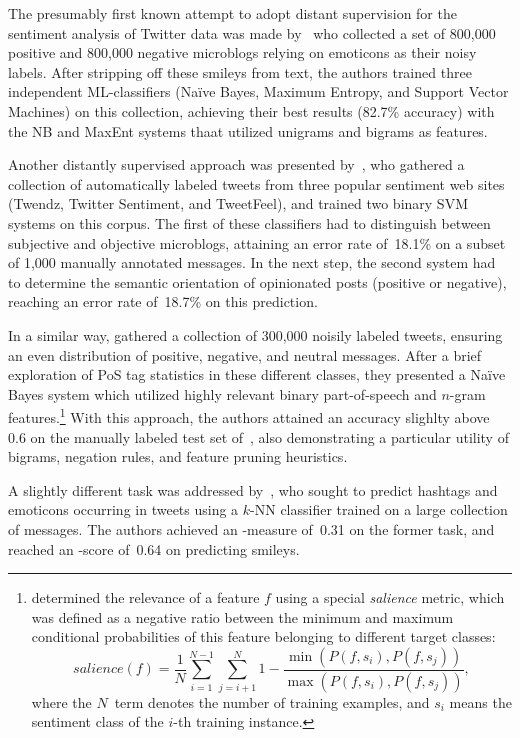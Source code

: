 The presumably first known attempt to adopt distant supervision for
the sentiment analysis of Twitter data was made by~\citet{Go:09} who
collected a set of 800,000 positive and 800,000 negative microblogs
relying on emoticons as their noisy labels.  After stripping off these
smileys from text, the authors trained three independent
ML-classifiers (Na{\"i}ve Bayes, Maximum Entropy, and Support Vector
Machines) on this collection, achieving their best results (82.7\%
accuracy) with the NB and MaxEnt systems thaat utilized unigrams and
bigrams as features.

Another distantly supervised approach was presented
by~\citet{Barbosa:10}, who gathered a collection of automatically
labeled tweets from three popular sentiment web sites (Twendz, Twitter
Sentiment, and TweetFeel), and trained two binary SVM systems on this
corpus.  The first of these classifiers had to distinguish between
subjective and objective microblogs, attaining an error rate of~18.1\%
on a subset of 1,000 manually annotated messages.  In the next step,
the second system had to determine the semantic orientation of
opinionated posts (positive or negative), reaching an error rate
of~18.7\% on this prediction.

In a similar way, \citet{Pak:10} gathered a collection of 300,000
noisily labeled tweets, ensuring an even distribution of positive,
negative, and neutral messages.  After a brief exploration of PoS tag
statistics in these different classes, they presented a Na{\"i}ve
Bayes system which utilized highly relevant binary part-of-speech and
$n$-gram features.\footnote{\citet{Pak:10} determined the relevance of
  a feature $f$ using a special \emph{salience} metric, which was
  defined as a negative ratio between the minimum and maximum
  conditional probabilities of this feature belonging to different
  target classes:
  \begin{equation*}
    salience(f) = \frac{1}{N}\sum_{i=1}^{N-1}\sum_{j=i+1}^N 1 - \frac{\min(P(f, s_i), P(f, s_j))}{\max(P(f, s_i), P(f, s_j))},
  \end{equation*}
  where the $N$~term denotes the number of training examples, and
  $s_i$ means the sentiment class of the $i$-th training instance.}
With this approach, the authors attained an accuracy slighlty above
0.6 on the manually labeled test set of~\citet{Go:09}, also
demonstrating a particular utility of bigrams, negation rules, and
feature pruning heuristics.

A slightly different task was addressed by~\citet{Davidov:10}, who
sought to predict hashtags and emoticons occurring in tweets using a
$k$-NN classifier trained on a large collection of messages.  The
authors achieved an \F-measure of~0.31 on the former task, and reached
an \F-score of~0.64 on predicting smileys.

